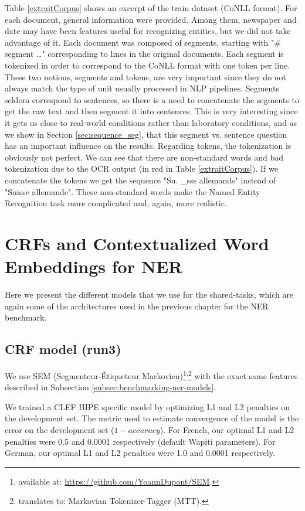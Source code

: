 Table \ref{extraitCorpus} shows an excerpt of the train dataset (CoNLL format). For each document, general information were provided. Among them, newspaper and date may have been features useful for recognizing entities, but we did not take advantage of it. Each document was composed of segments, starting with "\# segment \dots" corresponding to lines in the original documents. Each segment is tokenized in order to correspond to the CoNLL format with one token per line. These two notions, segments and tokens, are very important since they do not always match the type of unit usually processed in NLP pipelines. Segments seldom correspond to sentences, so there is a need to concatenate the segments to get the raw text and then segment it into sentences. This is very interesting since it gets us close to real-world conditions rather than laboratory conditions, and as we show in Section \ref{sec:sequence_seg}, that this segment vs. sentence question has an important influence on the results. Regarding tokens, the tokenization is obviously not perfect. We can see that there are non-standard words and bad tokenization due to the OCR output (in red in Table \ref{extraitCorpus}). If we concatenate the tokens we get the sequence "Su. \_sss allemands" instead of "Suisse allemande". These non-standard words make the Named Entity Recognition task more complicated and, again, more realistic.

\section{CRFs and Contextualized Word Embeddings for NER}
\label{sec:method}

Here we present the different models that we use for the shared-tasks, which are again some of the architectures used in the previous chapter for the NER benchmark.

\subsection{CRF model (run3)}

We use SEM (Segmenteur-Étiqueteur Markovien)\footnote{available at: \url{https://github.com/YoannDupont/SEM}.}\textsuperscript{,}\footnote{translates to: Markovian Tokenizer-Tagger (MTT).} \citep{dupont-2017-exploration} with the exact same features described in Subsection \ref{subsec:benchmarking-ner-models}.

We trained a CLEF HIPE specific model by optimizing L1 and L2 penalties on the development set. The metric used to estimate convergence of the model is the error on the development set ($1 - accuracy$). For French, our optimal L1 and L2 penalties were 0.5 and 0.0001 respectively (default Wapiti parameters). For German, our optimal L1 and L2 penalties were 1.0 and 0.0001 respectively.

